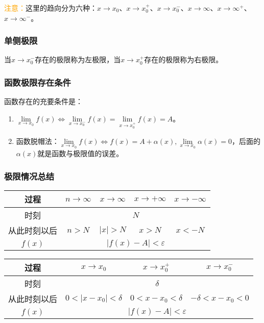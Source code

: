 \documentclass[UTF8, 12pt]{ctexart}
\begin{document}
\textcolor{orange}{注意：}这里的趋向分为六种：$x\to x_0$、$x\to x_0^+$、$x\to x_0^-$、$x\to\infty$、$x\to\infty^+$、$x\to\infty^-$。

\subsubsection{单侧极限}

当$x\to x_0^-$存在的极限称为左极限，当$x\to x_0^+$存在的极限称为右极限。

\subsubsection{函数极限存在条件}

函数存在的充要条件是：

\begin{enumerate}
    \item $\lim\limits_{x\to x_0}f(x)\Leftrightarrow\lim\limits_{x\to x_0^-}f(x)=\lim\limits_{x\to x_0^+}f(x)=A$。
    \item 函数脱帽法：$\lim\limits_{x\to x_0}f(x)\Leftrightarrow f(x)=A+\alpha(x),\lim\limits_{x\to x_0}\alpha(x)=0$，后面的$\alpha(x)$就是函数与极限值的误差。
\end{enumerate}

\subsubsection{极限情况总结}

\begin{center}
    \begin{tabular}{|c|c|c|c|c|}
        \hline
        过程 & $n\to\infty$ & $x\to\infty$ & $x\to+\infty$ & $x\to-\infty$ \\ \hline
        时刻 & \multicolumn{4}{c|}{$N$} \\ \hline
        从此时刻以后 & $n>N$ & $\vert x\vert>N$ & $x>N$ & $x<-N$ \\ \hline
        $f(x)$ & \multicolumn{4}{c|}{$\vert f(x)-A\vert<\varepsilon$} \\ 
        \hline
    \end{tabular}
\end{center}

\begin{center}
    \begin{tabular}{|c|c|c|c|}
        \hline
        过程 & $x\to x_0$ & $x\to x_0^+$ & $x\to x_0^-$ \\ \hline
        时刻 & \multicolumn{3}{c|}{$\delta$} \\ \hline
        从此时刻以后 & $0<\vert x-x_0\vert<\delta$ & $0<x-x_0<\delta$ & $-\delta<x-x_0<0$\\ \hline
        $f(x)$ & \multicolumn{3}{c|}{$\vert f(x)-A\vert<\varepsilon$} \\ 
        \hline
    \end{tabular}
\end{center}
\end{document}
